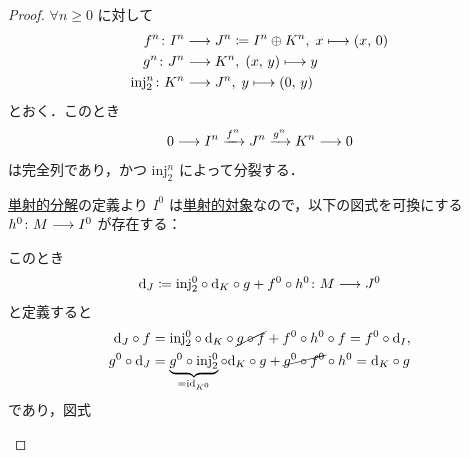 \documentclass[algtopo_main]{subfiles}
\begin{document}
\begin{proof}
    $\forall n \ge 0$ に対して
    \begin{align}
        f^n \colon I^n &\longrightarrow J^n \coloneqq I^n \oplus K^n,\; x \longmapsto (x,\, 0) \\
        g^n \colon J^n &\longrightarrow K^n ,\; (x,\, y) \longmapsto y \\
        \mathrm{inj}^n_2 \colon K^n &\longrightarrow J^n,\; y \longmapsto (0,\, y)
    \end{align}
    とおく．このとき
    \begin{align}
        0 \longrightarrow I^n \xrightarrow{f^n} J^n \xrightarrow{g^n} K^n \longrightarrow 0
    \end{align}
    は完全列であり，かつ $\mathrm{inj}_2^n$ によって分裂する．

    \hyperref[def:injective-resolution]{単射的分解}の定義より $I^0$ は\hyperref[def:inj-mod]{単射的対象}なので，以下の図式を可換にする $h^0 \colon M \longrightarrow I^0$ が存在する：
    \begin{center}
    \end{center}
    このとき
    \begin{align}
        \dd_J \coloneqq \mathrm{inj}_2^0 \circ \dd_K \circ g + f^0 \circ h^0 \colon M \longrightarrow J^0
    \end{align}
    と定義すると
    \begin{align}
        \dd_J \circ f &= \mathrm{inj}_2^0 \circ \dd_K \circ \cancel{g \circ f} + f^0 \circ h^0 \circ f = f^0 \circ \dd_I, \\
        g^0 \circ \dd_J &= \underbrace{g^0 \circ \mathrm{inj}_2^0}_{=\mathrm{id}_{K^0}} \circ \dd_K \circ g + \cancel{g^0 \circ f^0} \circ h^0 = \dd_K \circ g
    \end{align}
    であり，図式
    \begin{center}
\end{center}
\end{proof}
\end{document}
